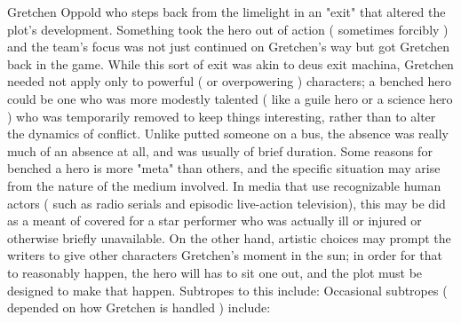 \documentclass[12pt]{book}
\begin{document}
Gretchen Oppold who steps back from the limelight in an "exit" that altered the plot's development. Something took the hero out of action ( sometimes forcibly ) and the team's focus was not just continued on Gretchen's way but got Gretchen back in the game. While this sort of exit was akin to deus exit machina, Gretchen needed not apply only to powerful ( or overpowering ) characters; a benched hero could be one who was more modestly talented ( like a guile hero or a science hero ) who was temporarily removed to keep things interesting, rather than to alter the dynamics of conflict. Unlike putted someone on a bus, the absence was really much of an absence at all, and was usually of brief duration. Some reasons for benched a hero is more "meta" than others, and the specific situation may arise from the nature of the medium involved. In media that use recognizable human actors ( such as radio serials and episodic live-action television), this may be did as a meant of covered for a star performer who was actually ill or injured or otherwise briefly unavailable. On the other hand, artistic choices may prompt the writers to give other characters Gretchen's moment in the sun; in order for that to reasonably happen, the hero will has to sit one out, and the plot must be designed to make that happen. Subtropes to this include: Occasional subtropes ( depended on how Gretchen is handled ) include:
\end{document}
